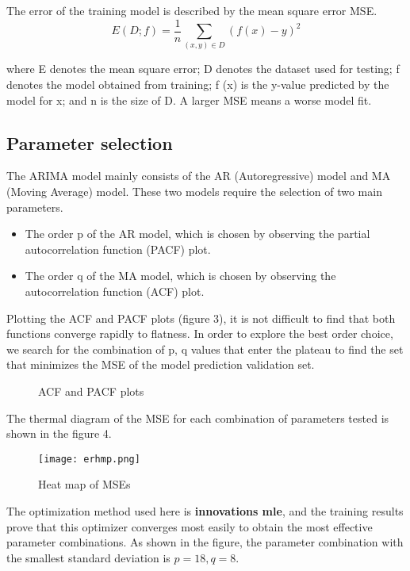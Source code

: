 \documentclass[12pt]{article}  %
\begin{document}
The error of the training model is described by the mean square error MSE.
\begin{equation}
E(D;f)=\frac1n\sum_{(x,y)\in D}(f(x)-y)^2
\end{equation}

where E denotes the mean square error; D denotes the dataset used for testing; f denotes the model obtained from training; f (x) is the y-value predicted by the model for x; and n is the size of D. A larger MSE means a worse model fit.

\subsection{Parameter selection}

The ARIMA model mainly consists of the AR (Autoregressive) model and MA (Moving Average) model. These two models require the selection of two main parameters.
\begin{itemize}
	\item The order p of the AR model, which is chosen by observing the partial autocorrelation function (PACF) plot.
	\item The order q of the MA model, which is chosen by observing the autocorrelation function (ACF) plot.
\end{itemize}
Plotting the ACF and PACF plots (figure 3), it is not difficult to find that both functions converge rapidly to flatness. In order to explore the best order choice, we search for the combination of p, q values that enter the plateau to find the set that minimizes the MSE of the model prediction validation set.
\begin{figure}[H]
	\centering    
	\caption{ACF and PACF plots}		%
	\label{img3}									%
\end{figure}
The thermal diagram of the MSE for each combination of parameters tested is shown in the figure 4.
\begin{figure}[H]
	\centering
	\texttt{[image: erhmp.png]}
	\caption{Heat map of MSEs}
	\label{img4}
\end{figure}

The optimization method used here is \textbf{innovations mle}, and the training results prove that this optimizer converges most easily to obtain the most effective parameter combinations. As shown in the figure, the parameter combination with the smallest standard deviation is $p=18,q=8$.
\end{document}
